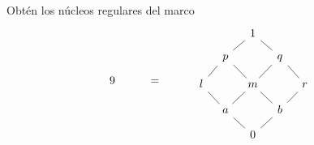 \begin{exe}%
    Obtén los núcleos regulares del marco
    \[
        9 \hspace{10mm} = \hspace{10mm} 
        \begin{tikzcd}[row sep=3mm, column sep=3mm]
            & & 1 \\
            & p \ar[ur,no head] && q \ar[ul,no head] \\
            l \ar[ur,no head]
                && m \ar[ul,no head] \ar[ur,no head]
                && r \ar[ul,no head] \\
            & a \ar[ul,no head]\ar[ur,no head]
                && b\ar[ul,no head]\ar[ur,no head] \\
            & & 0 \ar[ul,no head]\ar[ur,no head]
        \end{tikzcd}
    \]
\end{exe}
